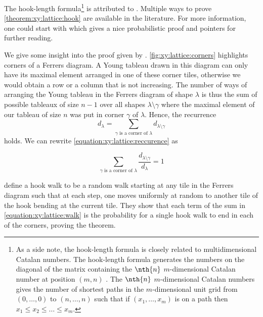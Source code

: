 The hook-length formula\footnote{
As a side note, the hook-length formula is closely related to
multidimensional Catalan numbers. The hook-length formula generates the numbers
on the diagonal of the matrix containing the \(\nth{n}\) \(m\)-dimensional
Catalan number at position \((m,n)\) \cite{OEIS:A060854}. The \(\nth{n}\)
\(m\)-dimensional Catalan numbers gives the number of shortest paths in the
\(m\)-dimensional unit grid from \( (0,\ldots,0) \) to \( (n,\ldots,n) \) such
that if \( (x_1,\ldots,x_m) \) is on a path then \( x_1 \le x_2 \le \ldots \le
x_m\).
}
is attributed to \citet*{frame:1954}. Multiple ways to
prove \ref{theorem:xy:lattice:hook} are available in the literature. For more
information, one could start with \citet*{greene:1979} which gives a nice
probabilistic proof and pointers for further reading.

We give some insight into the proof given by \citet*{greene:1979}.
\ref{fig:xy:lattice:corners} highlights corners of a Ferrers diagram. A Young
tableau drawn in this diagram can only have its maximal element arranged in
one of these corner tiles, otherwise we would obtain a row or a column that is
not increasing. The number of ways of arranging the Young tableau in the
Ferrers diagram of shape \(\lambda\) is thus the sum of possible tableaux of
size \(n-1\) over all shapes \(\lambda \setminus \gamma\) where the maximal
element of our tableau of size \(n\) was put in corner \(\gamma\) of
\(\lambda\). Hence, the recurrence
\begin{equation}\label{equation:xy:lattice:reccurence}
d_{\lambda} = \sum_{\gamma \text{ is a corner of } \lambda} d_{\lambda
\setminus \gamma}
\end{equation}
holds. We can rewrite \ref{equation:xy:lattice:reccurence} as

\begin{equation}\label{equation:xy:lattice:walk}
\sum_{\gamma \text{ is a corner of } \lambda} \frac{d_{\lambda
\setminus \gamma}}{d_{\lambda}} = 1
\end{equation}

\citet*{greene:1979} define a hook walk to be a random walk starting at
any tile in the Ferrers diagram such that at each step, one moves uniformly at
random to another tile of the hook bending at the current tile.
They show that each term of the sum in \ref{equation:xy:lattice:walk} is
the probability for a single hook walk to end in each of the corners, proving
the theorem.


